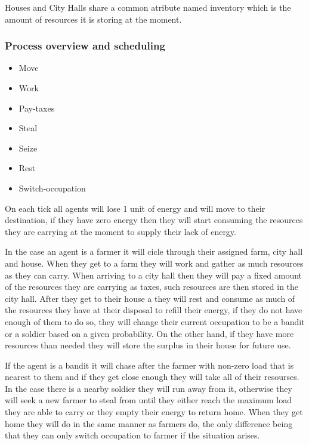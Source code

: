 \documentclass{wscpaperproc}
\theoremstyle{wsc}
\begin{document}
\noindent Houses and City Halls share a common atribute named inventory which is the amount of
resources it is storing at the moment.\hfill\break

\subsubsection{Process overview and scheduling}

\begin{itemize}
    \item Move
    \item Work
    \item Pay-taxes
    \item Steal
    \item Seize
    \item Rest
    \item Switch-occupation
\end{itemize}

On each tick all agents will lose 1 unit of energy and will move to their destination, if they have
zero energy then they will start consuming the resources they are carrying at the moment to supply
their lack of energy.

In the case an agent is a farmer it will cicle through their assigned farm, city hall and house.
When they get to a farm they will work and gather as much resources as they can carry.
When arriving to a city hall then they will pay a fixed amount of the resources they are carrying as
taxes, such resources are then stored in the city hall.
After they get to their house a they will rest and consume as much of the resources they have at
their disposal to refill their energy, if they do not have enough of them to do so, they will
change their current occupation to be a bandit or a soldier based on a given probability. On the
other hand, if they have more resources than needed they will store the surplus in their house
for future use.

If the agent is a bandit it will chase after the farmer with non-zero load that is nearest to them and
if they get close enough they will take all of their resourses. In the case there is a nearby soldier
they will run away from it, otherwise they will seek a new farmer to steal from until they either
reach the maximum load they are able to carry or they empty their energy to return home. When they get
home they will do in the same manner as farmers do, the only difference being that they can only
switch occupation to farmer if the situation arises.
\end{document}
